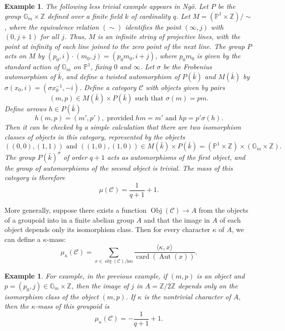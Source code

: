 \documentclass[brochure,english,12pt]{bourbaki}
\newtheorem{example}[equation]{Example}
\def\op#1{{\operatorname{#1}}}
\newcommand{\ring}[1]{\mathbb{#1}}
\def\C{{\mathcal C}}
\begin{document}
\begin{example}\label{ex:groupoid}
  The following less trivial example appears in Ng\^o.  Let $P$ be the
  group $\ring{G}_m\times \ring{Z}$ defined over a finite field $k$ of
  cardinality $q$.  Let $M = (\ring{P}^1\times\ring{Z})/\sim$, where
  the equivalence relation $(\sim)$ identifies the point $(\infty,j)$ with
  $(0,j+1)$ for all $j$.  Thus, $M$ is an infinite string of
  projective lines, with the point at infinity of each line joined to
  the zero point of the next line.  The group $P$ acts on $M$ by
  $(p_0,i)\cdot (m_0,j) = (p_0 m_0,i+j)$, where $p_0m_0$ is given by
  the standard action of $\ring{G}_m$ on $\ring{P}^1$, fixing $0$ and
  $\infty$.  Let $\sigma$ be the Frobenius automorphism of $\bar k$,
  and define a twisted automorphism of $P(\bar k)$ and $M(\bar k)$ by
  $\sigma(x_0,i) = (\sigma x_0^{-1},-i)$.  Define a category $\mathcal
  C$ with objects given by pairs
\begin{equation}\label{eqn:objects}
(m,p)\in M(\bar k)\times P(\bar k) \text{ such that } \sigma(m) = p
m.
\end{equation}
Define  arrows $h\in P(\bar k)$ 
\begin{equation}\label{eqn:arrows}
h(m,p) = (m',p'),    \text{ provided } hm = m' \text{ and } h p = p'\sigma(h).
\end{equation}  
Then it can be checked by a simple
calculation that there are two isomorphism classes of objects in this
category, represented by the objects
\[
((0,0),(1,1))\text{ and }  ((1,0),(1,0))\in M(\bar k)\times P(\bar k) = 
(\ring{P}^1\times\ring{Z}) \times (\ring{G}_m\times\ring{Z}).
\]
The group $P(\bar k)^\sigma$ of order $q+1$ acts as automorphisms of the first object,
and the group of automorphisms of the second object is trivial.  The mass of this category
is therefore
\[
\mu(\C) = \frac{1}{q+1} + 1.
\]
\end{example}

More generally, suppose there exists a function $\op{Obj}(\C)\to  A$ from the objects
of a groupoid into in a finite abelian group $A$ and that the image in $A$ of each object
depends only its isomorphism class.  Then for every
character $\kappa$ of $A$, we can define a $\kappa$-mass:
\[
\mu_\kappa(\C)= \sum_{x\in \op{obj}(\C)/\text{iso}} \frac{\langle\kappa,x\rangle}{\op{card}(\op{Aut}(x))}.
\]

\begin{example}
  For example, in the previous example, if $(m,p)$ is an object and
  $p=(p_0,j)\in \ring{G}_m\times\ring{Z}$, then the image of $j$ in
  $A=\ring{Z}/2\ring{Z}$ depends only on the isomorphism class of the
  object $(m,p)$.  If $\kappa$ is the nontrivial character of $A$,
  then the $\kappa$-mass of this groupoid is
\[
\mu_\kappa(\C) = -\frac{1}{q+1} + 1.
\]
\end{example}
\end{document}
